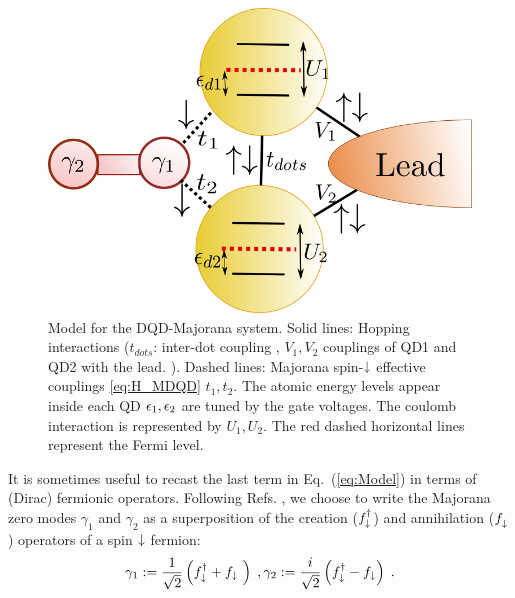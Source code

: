 \documentclass[showpacs,aps,prb,reprint,superscriptaddress]{revtex4-1}
\begin{document}
\begin{figure}[t]
\begin{center}
\includegraphics[scale=0.4]{Graficos/GenModel.png}
\end{center}
\caption{ Model for the DQD-Majorana system. Solid lines: Hopping interactions ($t_{dots}$: inter-dot coupling , $V_1,V_2$ couplings of QD1 and QD2 with the lead. ). Dashed lines: Majorana spin-$\downarrow$ effective couplings \eqref{eq:H_MDQD} $t_1,t_2$. The atomic energy levels appear inside each QD $\epsilon_1, \epsilon_2$ are tuned by the gate voltages. The coulomb interaction is represented by $U_1,U_2$.  The red dashed horizontal lines represent the Fermi level.
}
%
\label{fig:GenModel}
\end{figure}



It is sometimes useful to recast the last term in Eq.\ (\ref{eq:Model}) in terms of (Dirac) fermionic operators. Following Refs. , we choose to write the Majorana zero modes $\gamma_1$ and $\gamma_2$ as a superposition of the creation ($f^{\dagger}_\downarrow$) and annihilation ($f^{ }_\downarrow$) operators of a spin $\downarrow$ fermion:
%
\begin{equation}
    \gamma_1 := \frac{1}{\sqrt{2}} \left( f^\dagger_{\downarrow} + f_{\downarrow}\ \right) \; , \gamma_2 := \frac{i}{\sqrt{2}} \left( f^\dagger_{\downarrow} - f_{\downarrow} \right) \; . \label{eq:MajOp}
\end{equation}
\end{document}
